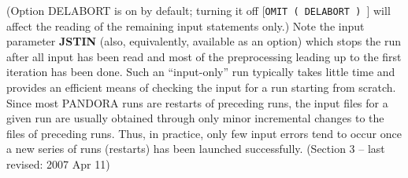 (Option DELABORT is on by default; turning it off
[{\tt OMIT ( DELABORT ) }]
will affect the reading of the remaining input statements only.)
\blankline
Note the input parameter {\bf JSTIN} (also, equivalently, available
as an option) which stops the run after all input has been
read and most of the preprocessing leading up to the first iteration
has been done. Such an
``input-only'' run typically takes little time and provides an
efficient means of checking the input for a run starting from
scratch.
\blankline
Since most PANDORA runs are restarts of preceding runs, the input
files for a given run are usually obtained through only minor
incremental changes to the files of preceding runs. Thus, in
practice, only few input errors tend to occur once a new series of
runs (restarts) has been launched successfully.
\blankline
\vfill
\noindent (Section 3 -- last revised: 2007 Apr 11) \par
{}
\ej

